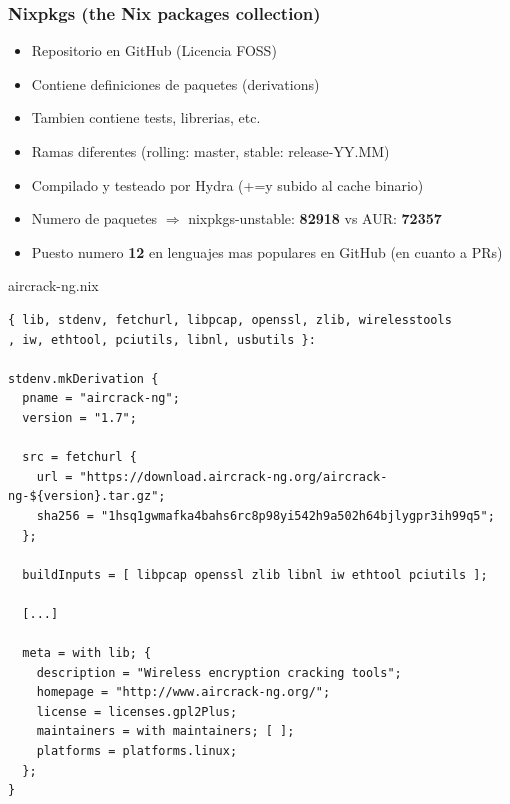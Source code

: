 \documentclass[aspectratio=43]{beamer}
\begin{document}
\begin{frame}
    \frametitle{Nixpkgs (the Nix packages collection)}
    \begin{itemize}
        \item Repositorio en GitHub (Licencia FOSS)
        \item Contiene definiciones de paquetes (derivations)
        \item Tambien contiene tests, librerias, etc.
        \item Ramas diferentes (rolling: master, stable: release-YY.MM)
        \item Compilado y testeado por Hydra (+=y subido al cache binario)
    \end{itemize}
\vspace{14}
    \begin{itemize}
        \item Numero de paquetes $\Rightarrow$ nixpkgs-unstable: \textbf{82918} vs AUR: \textbf{72357}
        \item Puesto numero \textbf{12} en lenguajes mas populares en GitHub (en cuanto a PRs)
    \end{itemize}
\end{frame}

\begin{frame}
        
\end{frame}

\begin{frame}[fragile]
    \begin{block}{aircrack-ng.nix}
\fontsize{7}{9}\begin{verbatim}
{ lib, stdenv, fetchurl, libpcap, openssl, zlib, wirelesstools
, iw, ethtool, pciutils, libnl, usbutils }:

stdenv.mkDerivation {
  pname = "aircrack-ng";
  version = "1.7";

  src = fetchurl {
    url = "https://download.aircrack-ng.org/aircrack-ng-${version}.tar.gz";
    sha256 = "1hsq1gwmafka4bahs6rc8p98yi542h9a502h64bjlygpr3ih99q5";
  };

  buildInputs = [ libpcap openssl zlib libnl iw ethtool pciutils ];

  [...]

  meta = with lib; {
    description = "Wireless encryption cracking tools";
    homepage = "http://www.aircrack-ng.org/";
    license = licenses.gpl2Plus;
    maintainers = with maintainers; [ ];
    platforms = platforms.linux;
  };
}
\end{verbatim}
\end{block}
\end{frame}
\end{document}
